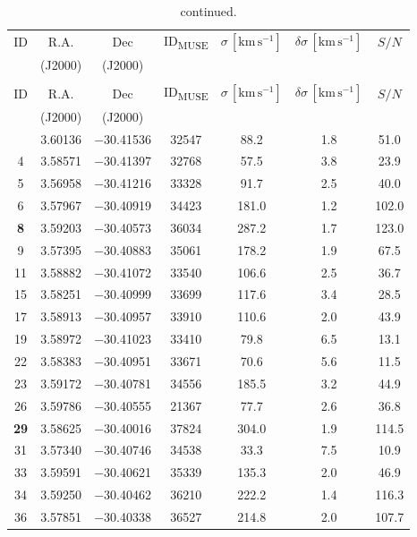 \documentclass{aa}
\begin{document}
\begin{appendix}
\begin{longtable}{c c c c c c c}
\caption{\label{tab:table2744} Velocity dispersion catalogue for A2744.}\\
\hline\hline
ID & R.A. & Dec & ID\textsubscript{MUSE} & $\sigma \, [\mathrm{km \, s^{-1}}]$ & $\delta \sigma \, [\mathrm{km \, s^{-1}}]$ & $S/N$ \\  & (J2000) & (J2000) & & & & \\
\hline
\endfirsthead
\caption{continued.}\\
\hline\hline
ID & R.A. & Dec & ID\textsubscript{MUSE} & $\sigma \, [\mathrm{km \, s^{-1}}]$ & $\delta \sigma \, [\mathrm{km \, s^{-1}}]$ & $S/N$ \\  & (J2000) & (J2000) & & & & \\
\hline
\endhead
\hline
\endfoot
2 & 3.60136 & $-$30.41536 & 32547 & 88.2 & 1.8 & 51.0 \\
4 & 3.58571 & $-$30.41397 & 32768 & 57.5 & 3.8 & 23.9 \\
5 & 3.56958 & $-$30.41216 & 33328 & 91.7 & 2.5 & 40.0 \\
6 & 3.57967 & $-$30.40919 & 34423 & 181.0 & 1.2 & 102.0 \\
\textbf{8} & 3.59203 & $-$30.40573 & 36034 & 287.2 & 1.7 & 123.0 \\
9 & 3.57395 & $-$30.40883 & 35061 & 178.2 & 1.9 & 67.5 \\
11 & 3.58882 & $-$30.41072 & 33540 & 106.6 & 2.5 & 36.7 \\
15 & 3.58251 & $-$30.40999 & 33699 & 117.6 & 3.4 & 28.5 \\
17 & 3.58913 & $-$30.40957 & 33910 & 110.6 & 2.0 & 43.9 \\
19 & 3.58972 & $-$30.41023 & 33410 & 79.8 & 6.5 & 13.1 \\
22 & 3.58383 & $-$30.40951 & 33671 & 70.6 & 5.6 & 11.5 \\
23 & 3.59172 & $-$30.40781 & 34556 & 185.5 & 3.2 & 44.9 \\
26 & 3.59786 & $-$30.40555 & 21367 & 77.7 & 2.6 & 36.8 \\
\textbf{29} & 3.58625 & $-$30.40016 & 37824 & 304.0 & 1.9 & 114.5 \\
31 & 3.57340 & $-$30.40746 & 34538 & 33.3 & 7.5 & 10.9 \\
33 & 3.59591 & $-$30.40621 & 35339 & 135.3 & 2.0 & 46.9 \\
34 & 3.59250 & $-$30.40462 & 36210 & 222.2 & 1.4 & 116.3 \\
36 & 3.57851 & $-$30.40338 & 36527 & 214.8 & 2.0 & 107.7 \\

\end{longtable}
\end{appendix}
\end{document}
